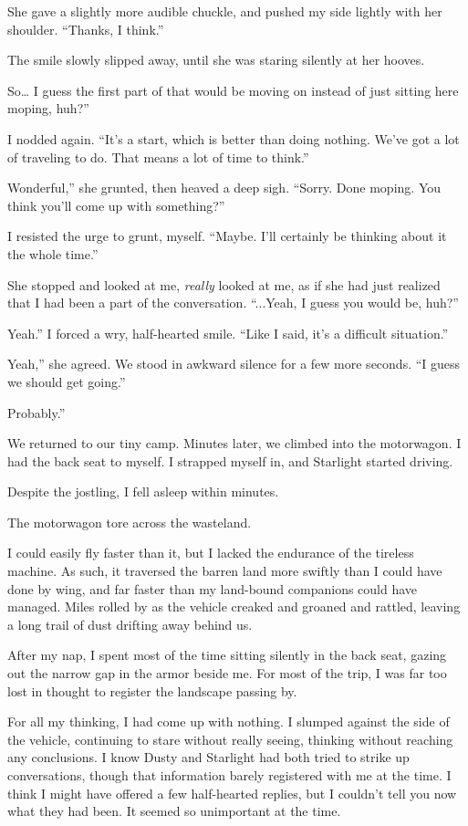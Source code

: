 She gave a slightly more audible chuckle, and pushed my side lightly with her shoulder. “Thanks, I think.”

The smile slowly slipped away, until she was staring silently at her hooves.

\leavevmode{}So… I guess the first part of that would be moving on instead of just sitting here moping, huh?”

I nodded again. “It’s a start, which is better than doing nothing. We’ve got a lot of traveling to do. That means a lot of time to think.”

\leavevmode{}Wonderful,” she grunted, then heaved a deep sigh. “Sorry. Done moping. You think you’ll come up with something?”

I resisted the urge to grunt, myself. “Maybe. I’ll certainly be thinking about it the whole time.”

She stopped and looked at me, \textit{really} looked at me, as if she had just realized that I had been a part of the conversation. “...Yeah, I guess you would be, huh?”

\leavevmode{}Yeah.” I forced a wry, half-hearted smile. “Like I said, it’s a difficult situation.”

\leavevmode{}Yeah,” she agreed. We stood in awkward silence for a few more seconds. “I guess we should get going.”

\leavevmode{}Probably.”

We returned to our tiny camp. Minutes later, we climbed into the motorwagon. I had the back seat to myself. I strapped myself in, and Starlight started driving.

Despite the jostling, I fell asleep within minutes.

{\br}%
The motorwagon tore across the wasteland.

I could easily fly faster than it, but I lacked the endurance of the tireless machine. As such, it traversed the barren land more swiftly than I could have done by wing, and far faster than my land-bound companions could have managed. Miles rolled by as the vehicle creaked and groaned and rattled, leaving a long trail of dust drifting away behind us.

After my nap, I spent most of the time sitting silently in the back seat, gazing out the narrow gap in the armor beside me. For most of the trip, I was far too lost in thought to register the landscape passing by.

For all my thinking, I had come up with nothing. I slumped against the side of the vehicle, continuing to stare without really seeing, thinking without reaching any conclusions. I know Dusty and Starlight had both tried to strike up conversations, though that information barely registered with me at the time. I think I might have offered a few half-hearted replies, but I couldn’t tell you now what they had been. It seemed so unimportant at the time.

